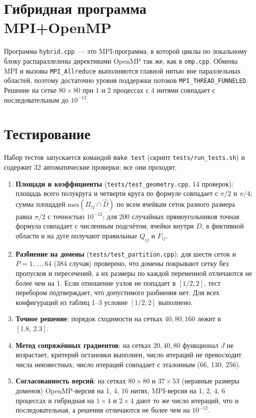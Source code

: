 \documentclass[12pt,a4paper]{article}
\begin{document}
\section{Гибридная программа MPI+OpenMP}

Программа \texttt{hybrid.cpp}~--- это MPI-программа, в которой циклы по локальному блоку
распараллелены директивами OpenMP так же, как в \texttt{omp.cpp}. Обмены MPI и вызовы
\texttt{MPI\_Allreduce} выполняются главной нитью вне параллельных областей,
поэтому достаточно уровня поддержки потоков \texttt{MPI\_THREAD\_\allowbreak FUNNELED}.
Решение на сетке $80\times80$ при 1 и 2 процессах с 4 нитями совпадает с последовательным
до $10^{-12}$.

\section{Тестирование}
Набор тестов запускается командой \texttt{make test} (скрипт \texttt{tests/run\_tests.sh}) и
содержит 32 автоматические проверки; все они проходят.
\begin{enumerate}
\item \textbf{Площади и коэффициенты} (\texttt{tests/test\_geometry.cpp}, 14 проверок): площадь
всего полукруга и четверти круга по формуле совпадает с $\pi/2$ и $\pi/4$; сумма площадей
$\mathrm{mes}(\Pi_{ij}\cap\hat D)$ по всем ячейкам сеток разного размера равна $\pi/2$ с
точностью $10^{-12}$; для 200 случайных прямоугольников точная формула совпадает с численным
подсчётом; ячейки внутри $D$, в фиктивной области и на дуге получают правильные $Q_{ij}$ и $F_{ij}$.
\item \textbf{Разбиение на домены} (\texttt{tests/test\_partition.cpp}): для шести сеток и
$P=1,\dots,64$ (384 случая) проверено, что домены покрывают сетку без пропусков и пересечений,
а их размеры по каждой переменной отличаются не более чем на 1. Если отношение узлов
не попадает в $[1/2,2]$, тест перебором подтверждает, что допустимого разбиения нет.
Для всех конфигураций из таблиц 1--3 условие $[1/2,2]$ выполнено.
\item \textbf{Точное решение}: порядок сходимости на сетках $40,80,160$ лежит в $[1.8,\,2.3]$.
\item \textbf{Метод сопряжённых градиентов}: на сетках $20,40,80$ функционал $J$ не возрастает,
критерий остановки выполнен, число итераций не превосходит числа неизвестных; число итераций
совпадает с эталонным (66, 130, 256).
\item \textbf{Согласованность версий}: на сетках $80\times80$ и $37\times53$ (неравные размеры
доменов) OpenMP-версия на 1, 4, 16 нитях, MPI-версия на 1, 2, 4, 6 процессах и гибридная
на $1\times4$ и $2\times4$ дают то же число итераций, что и последовательная, а решения
отличаются не более чем на $10^{-12}$.
\end{enumerate}
\end{document}
